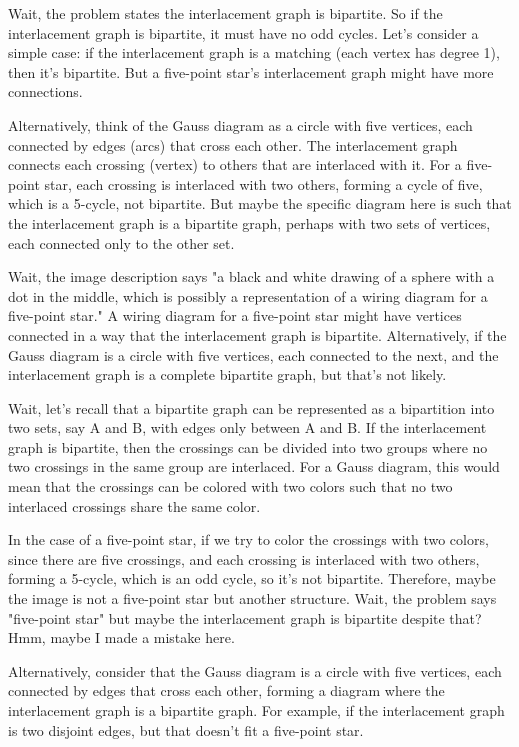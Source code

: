 Wait, the problem states the interlacement graph is bipartite. So if the interlacement graph is bipartite, it must have no odd cycles. Let's consider a simple case: if the interlacement graph is a matching (each vertex has degree 1), then it's bipartite. But a five-point star's interlacement graph might have more connections. 

Alternatively, think of the Gauss diagram as a circle with five vertices, each connected by edges (arcs) that cross each other. The interlacement graph connects each crossing (vertex) to others that are interlaced with it. For a five-point star, each crossing is interlaced with two others, forming a cycle of five, which is a 5-cycle, not bipartite. But maybe the specific diagram here is such that the interlacement graph is a bipartite graph, perhaps with two sets of vertices, each connected only to the other set. 

Wait, the image description says "a black and white drawing of a sphere with a dot in the middle, which is possibly a representation of a wiring diagram for a five-point star." A wiring diagram for a five-point star might have vertices connected in a way that the interlacement graph is bipartite. Alternatively, if the Gauss diagram is a circle with five vertices, each connected to the next, and the interlacement graph is a complete bipartite graph, but that's not likely. 

Wait, let's recall that a bipartite graph can be represented as a bipartition into two sets, say A and B, with edges only between A and B. If the interlacement graph is bipartite, then the crossings can be divided into two groups where no two crossings in the same group are interlaced. For a Gauss diagram, this would mean that the crossings can be colored with two colors such that no two interlaced crossings share the same color. 

In the case of a five-point star, if we try to color the crossings with two colors, since there are five crossings, and each crossing is interlaced with two others, forming a 5-cycle, which is an odd cycle, so it's not bipartite. Therefore, maybe the image is not a five-point star but another structure. Wait, the problem says "five-point star" but maybe the interlacement graph is bipartite despite that? Hmm, maybe I made a mistake here. 

Alternatively, consider that the Gauss diagram is a circle with five vertices, each connected by edges that cross each other, forming a diagram where the interlacement graph is a bipartite graph. For example, if the interlacement graph is two disjoint edges, but that doesn't fit a five-point star. 

